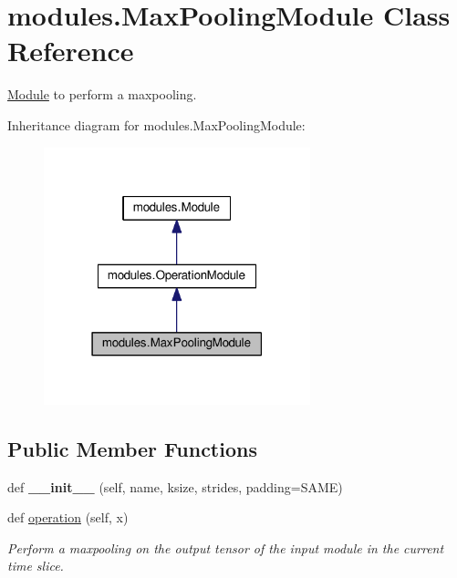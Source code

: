\hypertarget{classmodules_1_1_max_pooling_module}{}\section{modules.\+Max\+Pooling\+Module Class Reference}
\label{classmodules_1_1_max_pooling_module}


\hyperlink{classmodules_1_1_module}{Module} to perform a maxpooling.  




Inheritance diagram for modules.\+Max\+Pooling\+Module\+:\nopagebreak
\begin{figure}[H]
\begin{center}
\leavevmode
\includegraphics[width=219pt]{classmodules_1_1_max_pooling_module__inherit__graph}
\end{center}
\end{figure}
\subsection*{Public Member Functions}
\begin{DoxyCompactItemize}
\item 
\mbox{\label{classmodules_1_1_max_pooling_module_a9542dccd5adecfae6a79f6273e506aa3}} 
def {\bfseries \+\_\+\+\_\+init\+\_\+\+\_\+} (self, name, ksize, strides, padding=\textquotesingle{}S\+A\+ME\textquotesingle{})
\item 
def \hyperlink{classmodules_1_1_max_pooling_module_a833701a5c7f28279a21984069d3faa11}{operation} (self, x)
\begin{DoxyCompactList}\small\item\em Perform a maxpooling on the output tensor of the input module in the current time slice. \end{DoxyCompactList}\end{DoxyCompactItemize}
